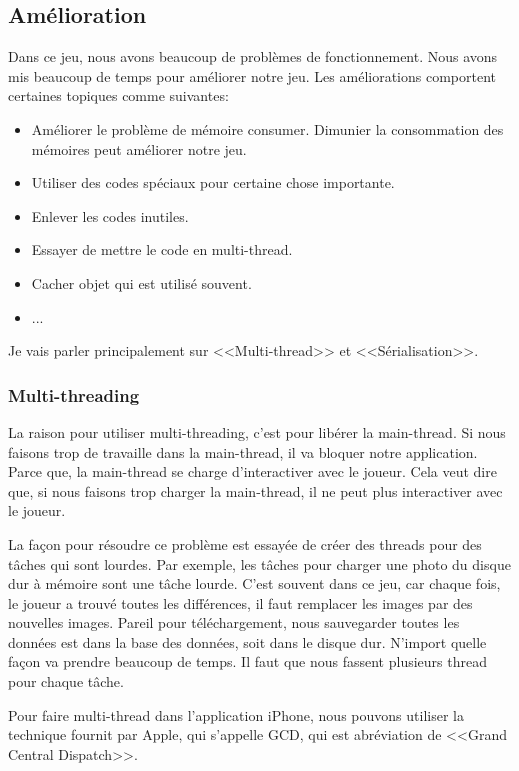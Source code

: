 \subsection{Amélioration} %
\label{sub:amélioration}

Dans ce jeu, nous avons beaucoup de problèmes de fonctionnement. Nous avons mis beaucoup de temps pour améliorer notre jeu. Les améliorations comportent certaines topiques comme suivantes:

\begin{itemize}
	\item Améliorer le problème de mémoire consumer. Dimunier la consommation des mémoires peut améliorer notre jeu. 
	\item Utiliser des codes spéciaux pour certaine chose importante.
	\item Enlever les codes inutiles.
	\item Essayer de mettre le code en multi-thread.
	\item Cacher objet qui est utilisé souvent.
	\item ...
\end{itemize}

Je vais parler principalement sur <<Multi-thread>> et <<Sérialisation>>.

\subsubsection{Multi-threading} %
\label{ssub:multi_thread}

La raison pour utiliser multi-threading, c'est pour libérer la main-thread. Si nous faisons trop de travaille dans la main-thread, il va bloquer notre application. Parce que, la main-thread se charge d'interactiver avec le joueur. Cela veut dire que, si nous faisons trop charger la main-thread, il ne peut plus interactiver avec le joueur. 

La façon pour résoudre ce problème est essayée de créer des threads pour des tâches qui sont lourdes. Par exemple, les tâches pour charger une photo du disque dur à mémoire sont une tâche lourde. C'est souvent dans ce jeu, car chaque fois, le joueur a trouvé toutes les différences, il faut remplacer les images par des nouvelles images. Pareil pour téléchargement, nous sauvegarder toutes les données est dans la base des données, soit dans le disque dur. N'import quelle façon va prendre beaucoup de temps. Il faut que nous fassent plusieurs thread pour chaque tâche.

Pour faire multi-thread dans l'application iPhone, nous pouvons utiliser la technique fournit par Apple, qui s'appelle GCD, qui est abréviation de <<Grand Central Dispatch>>.

